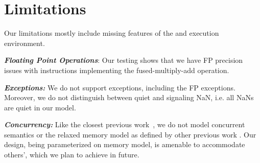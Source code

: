 \section{Limitations}\label{sec:limit}
Our limitations mostly include missing features of the \ISA and execution environment.

\vspace{2pt}
\noindent\textbf{\emph{Floating Point Operations}}: Our testing shows that we have FP precision issues with instructions implementing the fused-multiply-add operation. 

\vspace{2pt}
\noindent\textbf{\emph{Exceptions:}} We do not support exceptions, including the FP exceptions. Moreover, we do not distinguish between quiet and signaling NaN, i.e. all NaNs are quiet in our model. 

\vspace{2pt}
\noindent\textbf{\emph{Concurrency:}} 
Like the closest previous work~\cite{Goel:FMCAD14,Heule2016a}, we do not model concurrent semantics or the relaxed memory model as defined by other previous work \cite{Sarkar:POPL09,Owens:x86-TSO}. Our design, being parameterized on memory model, is amenable to accommodate others', which we plan to achieve in future.

